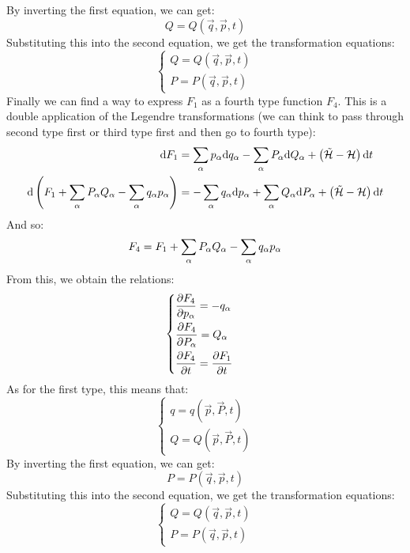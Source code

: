 By inverting the first equation, we can get:
\begin{equation}
    Q = Q(\vec{q},\vec{p},t)
\end{equation}
Substituting this into the second equation, we get the transformation equations:
\begin{equation}
    \begin{cases}
        Q = Q(\vec{q},\vec{p},t)\\
        P = P(\vec{q},\vec{p},t)
    \end{cases}
\end{equation}
Finally we can find a way to express $F_1$ as a fourth type function $F_4$. This is a double application of the Legendre transformations (we can think to pass through second type first or third type first and then go to fourth type):
\begin{equation}
    \begin{split}
        \mathrm{d}F_1 &= \displaystyle\sum_{\alpha}p_{\alpha}\mathrm{d}q_{\alpha} - \displaystyle\sum_{\alpha}P_{\alpha}\mathrm{d}Q_{\alpha} + \left(\tilde{\mathcal{H}}- \mathcal{H}\right)\mathrm{d}t\\
        \mathrm{d}\left(F_1 + \displaystyle\sum_{\alpha}P_{\alpha}Q_{\alpha} - \displaystyle\sum_{\alpha}q_{\alpha}p_{\alpha}\right) &= -\displaystyle\sum_{\alpha}q_{\alpha}\mathrm{d}p_{\alpha} + \displaystyle\sum_{\alpha}Q_{\alpha}\mathrm{d}P_{\alpha} + \left(\tilde{\mathcal{H}}- \mathcal{H}\right)\mathrm{d}t
    \end{split}
\end{equation}
And so:
\begin{equation}
    F_4 = F_1 + \displaystyle\sum_{\alpha}P_{\alpha}Q_{\alpha} - \displaystyle\sum_{\alpha}q_{\alpha}p_{\alpha}
\end{equation}
From this, we obtain the relations:
\begin{equation}
    \begin{cases}
        \dfrac{\partial F_4}{\partial p_{\alpha}} = -q_{\alpha}\\[8pt]
        \dfrac{\partial F_4}{\partial P_{\alpha}} = Q_{\alpha}\\[8pt]
        \dfrac{\partial F_4}{\partial t} = \dfrac{\partial F_1}{\partial t}
    \end{cases}
\end{equation}
As for the first type, this means that:
\begin{equation}
    \begin{cases}
        q = q(\vec{p},\vec{P},t)\\
        Q = Q(\vec{p},\vec{P},t)
    \end{cases}
\end{equation}
By inverting the first equation, we can get:
\begin{equation}
    P = P(\vec{q},\vec{p},t)
\end{equation}
Substituting this into the second equation, we get the transformation equations:
\begin{equation}
    \begin{cases}
        Q = Q(\vec{q},\vec{p},t)\\
        P = P(\vec{q},\vec{p},t)
    \end{cases}
\end{equation}
